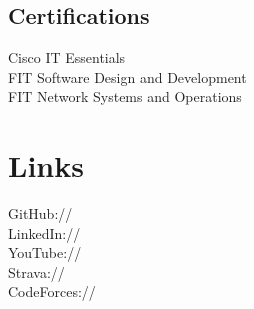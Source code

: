 \documentclass[]{deedy-resume-openfont}
\begin{document}
\begin{minipage}[t]{0.33\textwidth}
\subsection{Certifications}
\textbullet{} Cisco IT Essentials\\
\textbullet{} FIT Software Design and Development \\
\textbullet{} FIT Network Systems and Operations \\
\vspace{1mm}


\section{Links} 
GitHub:// \href{https://github.com/MathBunny}{} \\
LinkedIn://  \href{https://www.linkedin.com/in/horatiulazu}{} \\
YouTube://  \href{https://www.youtube.com/user/SoftwareEngenius}{} \\
Strava://  \href{https://www.strava.com/athletes/6214103}{} \\
CodeForces://  \href{http://codeforces.com/profile/MathBunny}{}
\sectionsep

%
%

\end{minipage} 
\hfill
\end{document}
